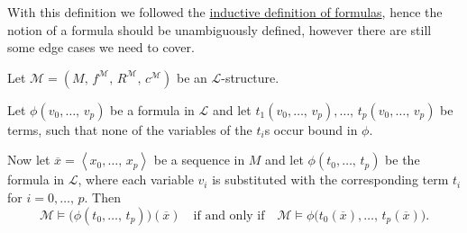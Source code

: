 \documentclass[../../main.tex]{subfiles}
\begin{document}
With this definition we followed the \hyperref[formula-def]{inductive definition of formulas},
hence the notion of a formula should be unambiguously defined, however there are still some edge cases we need to cover.

% 
%

\begin{theorem}\cite[Proposition 1.3.16]{Cha90}
    Let $\mathcal{M} = \left(M,\, f^{\mathcal{M}},\, R^{\mathcal{M}},\, c^{\mathcal{M}}\right)$ be an $\mathcal{L}$-structure.

    Let $\phi(v_0,\ldots,\, v_p)$ be a formula in $\mathcal{L}$ and let $t_1(v_0,\ldots,\, v_p),\ldots,\, t_p(v_0,\ldots,\, v_p)$ be terms, 
    such that none of the variables of the $t_i$s occur bound in $\phi$.

    Now let $\overline{x} = \left<x_0,\ldots,\, x_p\right>$ be a sequence in $M$ and let $\phi(t_0,\ldots,\, t_p)$ be the formula in $\mathcal{L}$,
    where each variable $v_i$ is substituted with the corresponding term $t_i$ for $i = 0,\ldots,\, p$.
    Then $$\mathcal{M} \models \big(\phi(t_0,\ldots,\, t_p)\big)(\overline{x}) \quad \text{if and only if} \quad \mathcal{M} \models  \phi\big(t_0(\overline{x}) ,\ldots,\, t_p(\overline{x})\big).$$
\end{theorem}
\end{document}
